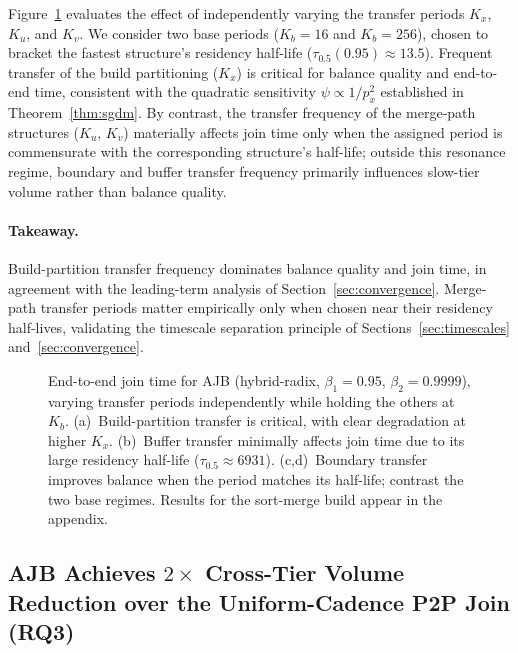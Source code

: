 \documentclass{article}
\begin{document}
Figure~\ref{fig:sync_freq} evaluates the effect of independently varying the
transfer periods $K_x$, $K_u$, and $K_v$. We consider two base periods ($K_b =
16$ and $K_b = 256$), chosen to bracket the fastest structure's residency
half-life ($\tau_{0.5}(0.95) \approx 13.5$). Frequent transfer of the build
partitioning ($K_x$) is critical for balance quality and end-to-end time,
consistent with the quadratic sensitivity $\psi \propto 1/p_x^2$ established in
Theorem~\ref{thm:sgdm}. By contrast, the transfer frequency of the merge-path
structures ($K_u$, $K_v$) materially affects join time only when the assigned
period is commensurate with the corresponding structure's half-life; outside
this resonance regime, boundary and buffer transfer frequency primarily
influences slow-tier volume rather than balance quality.

\paragraph{Takeaway.}
Build-partition transfer frequency dominates balance quality and join time, in
agreement with the leading-term analysis of Section~\ref{sec:convergence}.
Merge-path transfer periods matter empirically only when chosen near their
residency half-lives, validating the timescale separation principle of
Sections~\ref{sec:timescales} and~\ref{sec:convergence}.

\begin{figure}[t]
\centering
\caption{End-to-end join time for AJB (hybrid-radix, $\beta_1 = 0.95$,
$\beta_2 = 0.9999$), varying transfer periods independently while holding the
others at $K_b$. (a)~Build-partition transfer is critical, with clear
degradation at higher $K_x$. (b)~Buffer transfer minimally affects join time due
to its large residency half-life ($\tau_{0.5} \approx 6931$). (c,d)~Boundary
transfer improves balance when the period matches its half-life; contrast the
two base regimes. Results for the sort-merge build appear in the appendix.}
\label{fig:sync_freq}
\end{figure}

\subsection{AJB Achieves $2\times$ Cross-Tier Volume Reduction over the
Uniform-Cadence P2P Join (RQ3)}
\label{sec:rq3}
\end{document}
